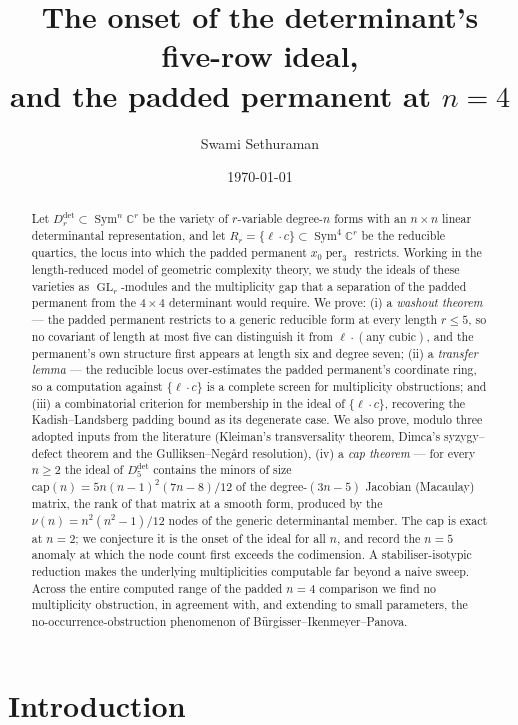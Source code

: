 \documentclass[11pt]{amsart}
\title[The determinant's five-row ideal and the padded permanent at $n=4$]
{The onset of the determinant's five-row ideal,\\ and the padded permanent at $n=4$}
\author{Swami Sethuraman}
\date{\today}
\theoremstyle{plain}
\theoremstyle{definition}
\theoremstyle{remark}
\DeclareMathOperator{\GL}{GL}
\DeclareMathOperator{\Sym}{Sym}
\DeclareMathOperator{\per}{per}
\newcommand{\bC}{\mathbb{C}}
\newcommand{\Rr}{R}
\newcommand{\Ddet}{D^{\det}}
\begin{document}
\begin{abstract}
Let $\Ddet_r\subset\Sym^{n}\bC^{r}$ be the variety of $r$-variable degree-$n$
forms with an $n\times n$ linear determinantal representation, and let
$\Rr_r=\{\ell\cdot c\}\subset\Sym^{4}\bC^{r}$ be the reducible quartics, the
locus into which the padded permanent $x_0\per_3$ restricts.  Working in the
length-reduced model of geometric complexity theory, we study the ideals of
these varieties as $\GL_r$-modules and the multiplicity gap that a separation
of the padded permanent from the $4\times4$ determinant would require.  We
prove: (i) a \emph{washout theorem} --- the padded permanent restricts to a
generic reducible form at every length $r\le5$, so no covariant of length at
most five can distinguish it from $\ell\cdot(\text{any cubic})$, and the
permanent's own structure first appears at length six and degree seven; (ii) a
\emph{transfer lemma} --- the reducible locus over-estimates the padded
permanent's coordinate ring, so a computation against $\{\ell\cdot c\}$ is a
complete screen for multiplicity obstructions; and (iii) a combinatorial
criterion for membership in the ideal of $\{\ell\cdot c\}$, recovering the
Kadish--Landsberg padding bound as its degenerate case.  We also prove,
modulo three adopted inputs from the literature (Kleiman's transversality
theorem, Dimca's syzygy--defect theorem and the Gulliksen--Neg\aa rd
resolution), (iv) a
\emph{cap theorem} --- for every $n\ge2$ the ideal of $\Ddet_5$ contains the
minors of size $\mathrm{cap}(n)=5n(n-1)^{2}(7n-8)/12$ of the degree-$(3n-5)$
Jacobian (Macaulay) matrix, the rank of that matrix at a smooth form, produced by the $\nu(n)=n^{2}(n^{2}-1)/12$
nodes of the generic determinantal member.  The cap is exact at $n=2$; we
conjecture it is the onset of the ideal for all $n$, and record the
$n=5$ anomaly at which the node count first exceeds the codimension.  A
stabiliser-isotypic reduction makes the underlying multiplicities computable
far beyond a naive sweep.  Across the entire computed range of the padded
$n=4$ comparison we find no multiplicity obstruction, in agreement with, and extending to small parameters,
the no-occurrence-obstruction phenomenon of B\"urgisser--Ikenmeyer--Panova.
\end{abstract}

\maketitle

\section{Introduction}\label{sec:intro}
\end{document}
